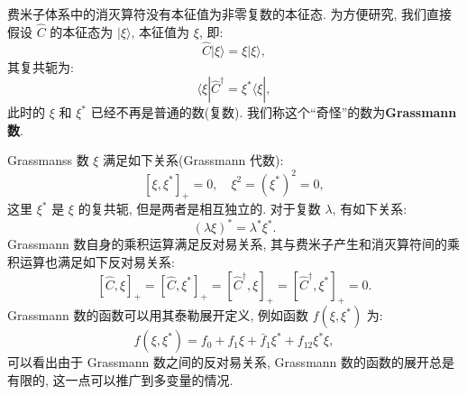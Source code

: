 费米子体系中的消灭算符没有本征值为非零复数的本征态. 为方便研究, 我们直接假设 $\hat C$ 的本征态为 $|\xi\rangle$, 本征值为 $\xi$, 即:
\begin{equation}
\hat C |\xi\rangle=\xi|\xi\rangle,
\end{equation}
其复共轭为:
\begin{equation}
\langle\xi| \hat{C}^{\dagger}=\xi^{*}\langle\xi|,
\end{equation}
此时的 $\xi$ 和 $\xi^{*}$ 已经不再是普通的数(复数). 我们称这个“奇怪”的数为\textbf{Grassmann 数}.

Grassmanss 数 $\xi$ 满足如下关系(Grassmann 代数):
\begin{equation}
\left[\xi, \xi^{*}\right]_{+}=0, \quad \xi^{2}=\left(\xi^{*}\right)^{2}=0,
\end{equation}
这里 $\xi^{*}$ 是 $\xi$ 的复共轭, 但是两者是相互独立的. 对于复数 $\lambda$, 有如下关系:
\begin{equation}
(\lambda \xi)^{*}=\lambda^{*} \xi^{*}.
\end{equation}
Grassmann 数自身的乘积运算满足反对易关系, 其与费米子产生和消灭算符间的乘积运算也满足如下反对易关系:
\begin{equation}
\left[\hat{C}, \xi\right]_{+}=\left[\hat{C}, \xi^{*}\right]_{+}=\left[\hat{C}^{\dagger}, \xi\right]_{+}=\left[\hat{C}^{\dagger}, \xi^{*}\right]_{+}=0 .
\end{equation}
Grassmann 数的函数可以用其泰勒展开定义, 例如函数 $f\left(\xi, \xi^{*}\right)$ 为:
\begin{equation}
f\left(\xi, \xi^{*}\right)=f_{0}+f_{1} \xi+\bar{f}_{1} \xi^{*}+f_{12} \xi^{*} \xi,
\end{equation}
可以看出由于 Grassmann 数之间的反对易关系, Grassmann 数的函数的展开总是有限的, 这一点可以推广到多变量的情况.

